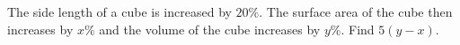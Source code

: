 The side length of a cube is increased by $20\%$. The surface area of the cube then increases by $x\%$ and the volume of the cube increases by $y\%$. Find $5(y-x)$.
